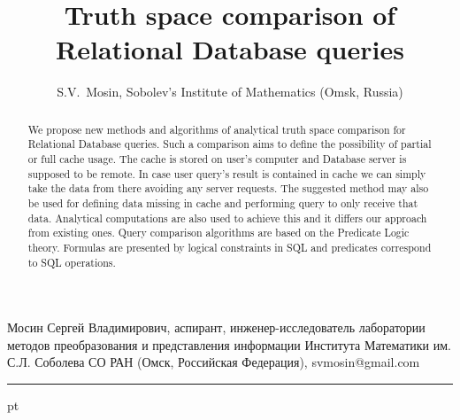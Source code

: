 \documentclass{cmi}
\begin{document}
{Мосин Сергей Владимирович,
аспирант,
инженер-исследователь лаборатории методов преобразования и представления информации Института Математики им. С.Л. Соболева СО РАН (Омск, Российская Федерация),
svmosin@gmail.com}

{\phantom{eee} \hrule {} pt}
\classify{} %
\author{S.V.~Mosin, {\rm  Sobolev's Institute of Mathematics (Omsk, Russia)}}
\title{Truth space comparison of Relational Database queries}
\maketitle{}

\begin{abstract}%
We propose new methods and algorithms of analytical truth space comparison for Relational Database queries.
Such a comparison aims to define the possibility of partial or full cache usage. The cache is stored on
user's computer and Database server is supposed to be remote. In case user query's result is contained in
cache we can simply take the data from there avoiding any server requests. The suggested method may also be
used for defining data missing in cache and performing query to only receive that data. Analytical
computations are also used to achieve this and it differs our approach from existing ones. Query comparison
algorithms are based on the Predicate Logic theory. Formulas are presented by logical constraints in SQL
and predicates correspond to SQL operations.

\end{abstract}
\end{document}
